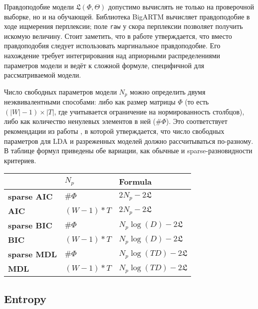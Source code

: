 Правдоподобие модели $\mathfrak{L}(\Phi,\Theta)$ допустимо вычислять не только на проверочной выборке, но и на обучающей. Библиотека BigARTM вычисляет правдоподобие в ходе ищмерения перплексии; поле \texttt{raw} у скора перплексии позволяет получить искомую величину. Стоит заметить, что в работе \cite{gerlach2018network} утверждается, что вместо правдоподобия следует использовать маргинальное правдоподобие. Его нахождение требует интегрирования над априорными распределениями параметров модели и ведёт к сложной формуле, специфичной для рассматриваемой модели.

Число свободных параметров модели $N_p$ можно определить двумя неэквивалентными способами: либо как размер матрицы $\Phi$ (то есть $(|W|-1) \times |T|$, где учитывается ограничение на нормированность столбцов), либо как количество ненулевых элементов в ней ($\#\Phi$). Это соответствует рекомендации из работы \cite{than2012fully}, в которой утверждается, что число свободных параметров для LDA и разреженных моделей должно рассчитываться по-разному. В таблице формул приведены обе вариации, как обычные и sparse-разновидности критериев.

\begin{table}[h]
    \centering
    \begin{tabular}{lll}
    \toprule
               & $N_p$       & Formula                                             \\
    \midrule
    \textbf{sparse AIC} & $\#\Phi$       & $2 N_p - 2 \mathfrak{L}$                \\
    \textbf{AIC}        & $(W - 1) * T$  & $2 N_p - 2 \mathfrak{L}$                \\
    \textbf{sparse BIC} & $\#\Phi$       & $N_p \log(D) - 2 \mathfrak{L}$          \\
    \textbf{BIC}        & $(W - 1) * T$  & $N_p \log(D) - 2 \mathfrak{L}$          \\
    \textbf{sparse MDL} & $\#\Phi$       & $N_p \log(TD) - 2 \mathfrak{L}$         \\
    \textbf{MDL}        & $(W - 1) * T$  & $N_p \log(TD) - 2 \mathfrak{L}$\\
    \bottomrule
    \end{tabular}
\end{table}

\subsection{Entropy} 

